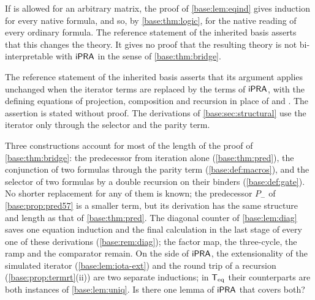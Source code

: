 \begin{question}
\label{base:q:compound}
If  is allowed for an arbitrary matrix, the proof of
\cref{base:lem:eqind} gives induction for every native formula, and so, by
\cref{base:thm:logic}, for the native reading of every ordinary formula.
The reference statement of the inherited basis asserts that this changes
the theory.  It gives no proof that the resulting theory is not
bi-interpretable with $\mathsf{iPRA}$ in the sense of \cref{base:thm:bridge}.
\end{question}

\begin{question}
\label{base:q:prlanguage}
The reference statement of the inherited basis asserts that its argument
applies unchanged when the iterator terms are replaced by the terms of
$\mathsf{iPRA}$, with the defining equations of projection, composition and
recursion in place of  and .  The assertion is
stated without proof.  The derivations of \cref{base:sec:structural} use
the iterator only through the selector and the parity term.
\end{question}

\begin{question}
\label{base:q:shorter}
Three constructions account for most of the length of the proof of
\cref{base:thm:bridge}: the predecessor from iteration alone
(\cref{base:thm:pred}), the conjunction of two formulas through the parity
term (\cref{base:def:macros}), and the selector of two formulas by a double
recursion on their binders (\cref{base:def:gate}).  No shorter replacement
for any of them is known; the predecessor $P_-$ of \cref{base:prop:pred57}
is a smaller term, but its derivation has the same structure and length as
that of \cref{base:thm:pred}.  The diagonal counter of \cref{base:lem:diag}
saves one equation induction and the final calculation in the last stage of
every one of these derivations (\cref{base:rem:diag}); the factor map, the
three-cycle, the ramp and the comparator remain.  On the side of $\mathsf{iPRA}$, the extensionality of the
simulated iterator (\cref{base:lem:iota-ext}) and the round trip of a
recursion (\cref{base:prop:termrt}(ii)) are two separate inductions; in
$\mathsf{T}_{\mathrm{eq}}$ their counterparts are both instances of \cref{base:lem:uniq}.  Is
there one lemma of $\mathsf{iPRA}$ that covers both?
\end{question}

